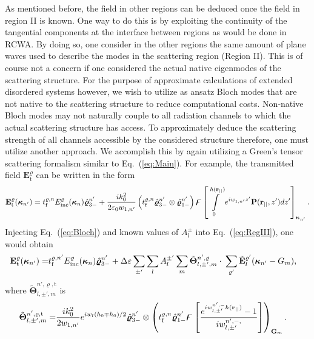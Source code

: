 \documentclass[ floatfix,reprint,amsmath,amssymb,aps,prb]{revtex4-1}
\begin{document}
\begin{widetext}
As mentioned before, the field in other regions can be deduced once the field in region II is known. One way to do this is by exploiting the continuity of the tangential components at the interface between regions as would be done in RCWA. By doing so, one consider in the other regions the same amount of plane waves used to describe the modes in the scattering region (Region II). This is of course not a concern if one considered the actual native eigenmodes of the scattering structure. For the purpose of approximate calculations of extended disordered systems however, we wish to utilize as ansatz Bloch modes that are not native to the scattering structure to reduce computational costs. Non-native Bloch modes may not naturally couple to all radiation channels to which the actual scattering structure has access. To approximately deduce the scattering strength of all channels accessible by the considered structure therefore, one must utilize another approach. We accomplish this by again utilizing a Green's tensor scattering formalism similar to Eq.~(\ref{eq:Main}). For example, the transmitted field $\mathbf{E}^{\varrho}_{\mathrm{t}}$ can be written in the form 
\begin{equation}
\mathbf{E}^{\varrho}_{\mathrm{t}}(\boldsymbol{\kappa}_{n'}) = t_{\textnormal{f}}^{\varrho,n} E_{\mathrm{inc}}^{\varrho}(\boldsymbol{\kappa}_{n})\hat{\boldsymbol{\varrho}}_{3-}^{n'} +\frac{ik_{0}^{2}}{2\varepsilon_{0}w_{1,n'}}\left(t_{\textnormal{f}}^{\varrho, n} \hat{\boldsymbol{\varrho }}_{3-}^{n'}\otimes\hat{\boldsymbol{\varrho}}{}_{1-}^{n'} \right) \mathbf{\digamma}\left[\intop_{0}^{h(\mathbf{r_{||}})}e^{iw_{1,n'}z'}\mathbf{P}(\mathbf{r_{||}},z')dz'\right]_{\boldsymbol{\kappa}_{n'}}.\label{eq:RegIII}
\end{equation}
Injecting Eq.~(\ref{eq:Bloch}) and known values of $A^\pm_{l}$ into  Eq.~(\ref{eq:RegIII}), one would obtain
\begin{align}
\mathbf{E}^{\varrho}_{\mathrm{t}}(\boldsymbol{\kappa}_{n'})=& t_{\textnormal{f}}^{\varrho,n'} E_{\mathrm{inc}}^{\varrho} (\boldsymbol{\kappa}_{n}) \hat{\boldsymbol{\varrho}}_{3-}^{n'} + \Delta\varepsilon   \sum_{\pm'} \sum_{l} A^{\pm'}_{l} \sum_{m} \tilde{ \boldsymbol{\Theta}}^{n',\varrho}_{l,\pm',m} \cdot\:  \sum_{\varrho'}  \tilde{\mathbf{E}}^{\varrho'}_{l}(\boldsymbol{\kappa}_{n'}-G_{m}),\label{eq:ReqIIIlin}
\end{align}
where $\tilde{ \boldsymbol{\Theta}}^{n',\varrho,\mathrm{t}}_{l,\pm',m}$ is 
\begin{align}
\tilde{ \boldsymbol{\Theta}}^{n',\varrho,\mathrm{t}}_{l,\pm',m} = &  \frac{ik_{0}^2}{2w_{1,n'}}  e^{iw_{l}(h_0 \mp h_0)/2} \hat{\boldsymbol{\varrho}}_{3-}^{n'}\otimes \left( t_{\textnormal{f}}^{\varrho,n} \hat{\boldsymbol{\varrho}}_{1-}^{n'} \digamma\left[  \frac{ e^{iw^{n',-}_{l,\pm'} h( \mathbf{r_{||} } ) }-1}{iw^{n',-,}_{l,\pm'}}\right] \right)_{\mathbf{G}_m}. \label{eq:Theta}

\end{align}
\end{widetext}
\end{document}
